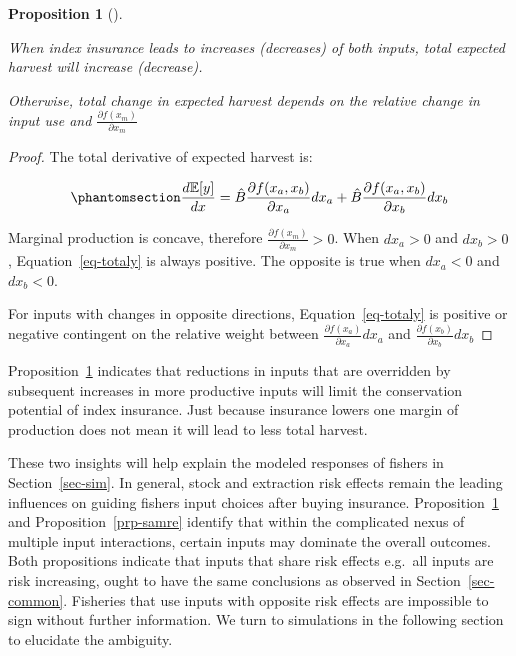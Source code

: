 \documentclass[
  letterpaper,
  DIV=11,
  numbers=noendperiod]{scrartcl}
\theoremstyle{plain}
\theoremstyle{plain}
\newtheorem{proposition}{Proposition}[section]
\theoremstyle{remark}
\begin{document}
\begin{proposition}[]\protect\hypertarget{prp-har}{}\label{prp-har}

When index insurance leads to increases (decreases) of both inputs,
total expected harvest will increase (decrease).

Otherwise, total change in expected harvest depends on the relative
change in input use and \(\frac{\partial f(x_m)}{\partial x_m}\)

\end{proposition}

\begin{proof}
The total derivative of expected harvest is:

\begin{equation}\phantomsection\label{eq-totaly}{
\frac{d \mathbb{E}[y]}{dx}=\hat{B}\frac{\partial f(x_a,x_b)}{\partial x_a}dx_a+\hat{B}\frac{\partial f(x_a,x_b)}{\partial x_b}dx_b
}\end{equation}

Marginal production is concave, therefore
\(\frac{\partial f(x_m)}{\partial x_m}>0\). When \(dx_a>0\) and
\(dx_b>0\), Equation~\ref{eq-totaly} is always positive. The opposite is
true when \(dx_a<0\) and \(dx_b<0\).

For inputs with changes in opposite directions, Equation~\ref{eq-totaly}
is positive or negative contingent on the relative weight between
\(\frac{\partial f(x_a)}{\partial x_a}dx_a\) and
\(\frac{\partial f(x_b)}{\partial x_b}dx_b\)
\end{proof}

Proposition~\ref{prp-har} indicates that reductions in inputs that are
overridden by subsequent increases in more productive inputs will limit
the conservation potential of index insurance. Just because insurance
lowers one margin of production does not mean it will lead to less total
harvest.

These two insights will help explain the modeled responses of fishers in
Section~\ref{sec-sim}. In general, stock and extraction risk effects
remain the leading influences on guiding fishers input choices after
buying insurance. Proposition~\ref{prp-har} and
Proposition~\ref{prp-samre} identify that within the complicated nexus
of multiple input interactions, certain inputs may dominate the overall
outcomes. Both propositions indicate that inputs that share risk effects
e.g.~all inputs are risk increasing, ought to have the same conclusions
as observed in Section~\ref{sec-common}. Fisheries that use inputs with
opposite risk effects are impossible to sign without further
information. We turn to simulations in the following section to
elucidate the ambiguity.
\end{document}

